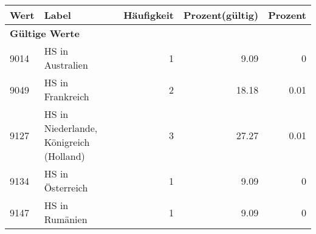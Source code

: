      \begin{longtable}{lXrrr}
     \toprule
     \textbf{Wert} & \textbf{Label} & \textbf{Häufigkeit} & \textbf{Prozent(gültig)} & \textbf{Prozent} \\
     \endhead
     \midrule
     \multicolumn{5}{l}{\textbf{Gültige Werte}}\\

     9014 &
     \multicolumn{1}{X}{ HS in Australien   } &


       \num{1} &
       \num[round-mode=places,round-precision=2]{9,09} &
         \num[round-mode=places,round-precision=2]{0} \\

     9049 &
     \multicolumn{1}{X}{ HS in Frankreich   } &


       \num{2} &
       \num[round-mode=places,round-precision=2]{18,18} &
         \num[round-mode=places,round-precision=2]{0,01} \\

     9127 &
     \multicolumn{1}{X}{ HS in Niederlande, Königreich (Holland)   } &


       \num{3} &
       \num[round-mode=places,round-precision=2]{27,27} &
         \num[round-mode=places,round-precision=2]{0,01} \\

     9134 &
     \multicolumn{1}{X}{ HS in Österreich   } &


       \num{1} &
       \num[round-mode=places,round-precision=2]{9,09} &
         \num[round-mode=places,round-precision=2]{0} \\

     9147 &
     \multicolumn{1}{X}{ HS in Rumänien   } &


       \num{1} &
       \num[round-mode=places,round-precision=2]{9,09} &
         \num[round-mode=places,round-precision=2]{0} \\


\end{longtable}
